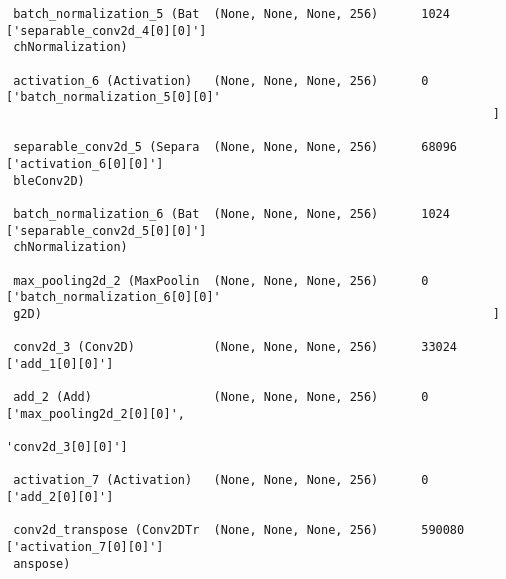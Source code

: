 \documentclass[
  letterpaper,
  DIV=11,
  numbers=noendperiod]{scrreprt}
\begin{document}
\begin{verbatim}
 batch_normalization_5 (Bat  (None, None, None, 256)      1024      ['separable_conv2d_4[0][0]']  
 chNormalization)                                                                                 
                                                                                                  
 activation_6 (Activation)   (None, None, None, 256)      0         ['batch_normalization_5[0][0]'
                                                                    ]                             
                                                                                                  
 separable_conv2d_5 (Separa  (None, None, None, 256)      68096     ['activation_6[0][0]']        
 bleConv2D)                                                                                       
                                                                                                  
 batch_normalization_6 (Bat  (None, None, None, 256)      1024      ['separable_conv2d_5[0][0]']  
 chNormalization)                                                                                 
                                                                                                  
 max_pooling2d_2 (MaxPoolin  (None, None, None, 256)      0         ['batch_normalization_6[0][0]'
 g2D)                                                               ]                             
                                                                                                  
 conv2d_3 (Conv2D)           (None, None, None, 256)      33024     ['add_1[0][0]']               
                                                                                                  
 add_2 (Add)                 (None, None, None, 256)      0         ['max_pooling2d_2[0][0]',     
                                                                     'conv2d_3[0][0]']            
                                                                                                  
 activation_7 (Activation)   (None, None, None, 256)      0         ['add_2[0][0]']               
                                                                                                  
 conv2d_transpose (Conv2DTr  (None, None, None, 256)      590080    ['activation_7[0][0]']        
 anspose)                                                                                         
                                                                                                  

\end{verbatim}
\end{document}
